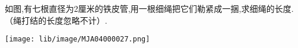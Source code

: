 如图,有七根直径为2厘米的铁皮管,用一根细绳把它们勒紧成一捆,求细绳的长度.（绳打结的长度忽略不计）.

\begin{flushright}

    \texttt{[image: lib/image/MJA04000027.png]}

\end{flushright}



